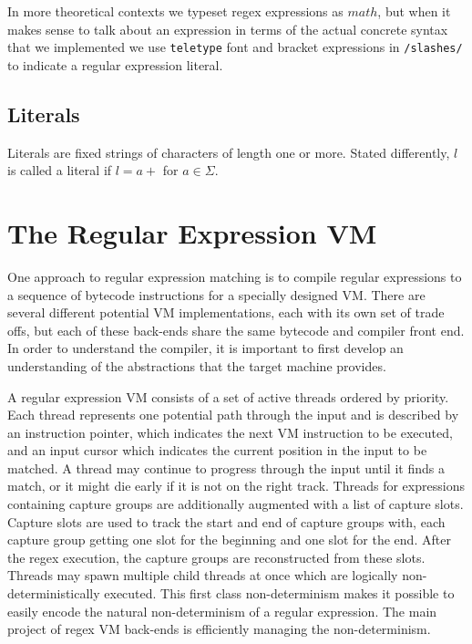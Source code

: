In more theoretical contexts we typeset regex expressions as
$math$, but when it makes sense to talk about an expression in
terms of the actual concrete syntax that we implemented we
use \verb'teletype' font and bracket expressions in \verb'/slashes/'
to indicate a regular expression literal.

\subsection{Literals}

Literals are fixed strings of characters of length one or more.
Stated differently, $l$ is called a literal if $l = a+$ for $a \in \Sigma$.

\section{The Regular Expression VM}
\label{section:vm}

One approach to regular expression matching is to compile regular expressions
to a sequence of bytecode instructions for a specially designed VM. There
are several different potential VM implementations, each with its own
set of trade offs, but each of these back-ends share the same bytecode
and compiler front end. In order to understand the compiler, it
is important to first develop an understanding of the abstractions
that the target machine provides.

A regular expression VM consists of a set of active threads
ordered by priority. Each thread represents one potential
path through the input and is described by an instruction
pointer, which indicates the next VM instruction to be
executed, and an input cursor which indicates the current
position in the input to be matched. A thread may continue
to progress through the input until it finds a match, or
it might die early if it is not on the right track. Threads for
expressions containing capture groups are additionally augmented with
a list of capture slots. Capture slots are used to
track the start and end of capture groups with, each capture
group getting one slot for the beginning and one slot for the
end. After the regex execution, the capture groups
are reconstructed from these slots.  Threads may spawn multiple child
threads at once which are logically non-deterministically executed.
This first class non-determinism makes it possible to easily encode
the natural non-determinism of a regular expression. The main
project of regex VM back-ends is efficiently managing the non-determinism.


